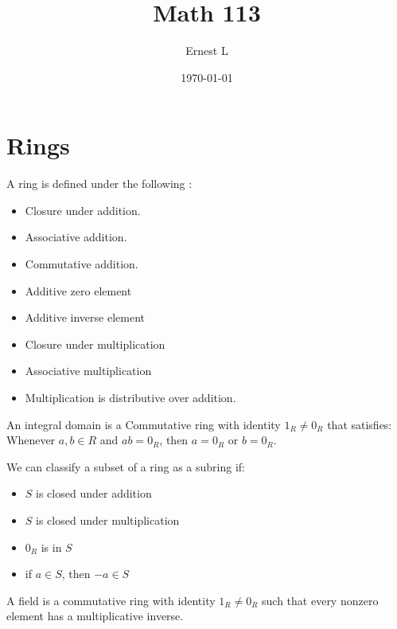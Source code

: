 \documentclass[11pt]{article}
\author{Ernest L}
\date{\today}
\title{Math 113}
\begin{document}
\maketitle
\section{Rings}

\begin{definition}
    A ring is defined under the following :
    \begin{itemize}
        \item
        Closure under addition.
        \item
        Associative addition.
        \item
        Commutative addition.
        \item
        Additive zero element
        \item
        Additive inverse element
        \item
        Closure under multiplication
        \item
        Associative multiplication  
        \item
        Multiplication is distributive over addition.
    \end{itemize}
\end{definition}

\begin{definition}
    An integral domain is a Commutative ring with identity $1_R \ne 0_R$ that satisfies: Whenever $a, b \in R$ and $ab = 0_R$, then $a = 0_R$ or $b = 0_R$.
\end{definition}

\begin{definition}
    We can classify a subset of a ring as a subring if:
    \begin{itemize}
        \item
        $S$ is closed under addition
        \item
        $S$ is closed under multiplication
        \item
        $0_R$ is in $S$
        \item
        if $a \in S$, then $-a \in S$   
    \end{itemize}
\end{definition}

\begin{definition}
    A field is a commutative ring with identity $1_R \ne 0_R$ such that every nonzero element has a multiplicative inverse. 
\end{definition}
    
\end{document}
